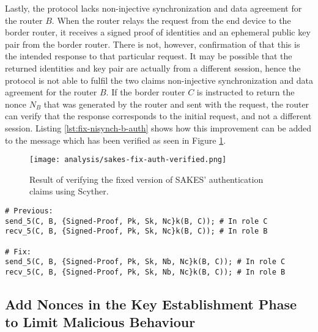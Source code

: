 Lastly, the protocol lacks non-injective synchronization and data agreement for the router $B$. When the router relays the request from the end device to the border router, it receives a signed proof of identities and an ephemeral public key pair from the border router. There is not, however, confirmation of that this is the intended response to that particular request. It may be possible that the returned identities and key pair are actually from a different session, hence the protocol is not able to fulfil the two claims non-injective synchronization and data agreement for the router $B$. If the border router $C$ is instructed to return the nonce $N_B$ that was generated by the router and sent with the request, the router can verify that the response corresponds to the initial request, and not a different session. Listing \ref{lst:fix-nisynch-b-auth} shows how this improvement can be added to the message which has been verified as seen in Figure \ref{fig:sakes-fix-auth-verified}.

\begin{figure}[H]
	\centering
	\texttt{[image: analysis/sakes-fix-auth-verified.png]}
	\caption{Result of verifying the fixed version of SAKES' authentication claims using Scyther.}
	\label{fig:sakes-fix-auth-verified}
\end{figure}


\newpage


\begin{lstlisting}[caption={[Fix to the SAKES protocol to provide non-injective synchronization and data agreement for the router during the authentication phase.]Fix to the SAKES protocol to provide non-injective synchronization and data agreement for the router $B$ during the authentication phase. Changes to the protocol are highlighted in blue.}, label={lst:fix-nisynch-b-auth}, style=code-improvements-sakes-2]
# Previous:
send_5(C, B, {Signed-Proof, Pk, Sk, Nc}k(B, C)); # In role C
recv_5(C, B, {Signed-Proof, Pk, Sk, Nc}k(B, C)); # In role B
	
# Fix:
send_5(C, B, {Signed-Proof, Pk, Sk, Nb, Nc}k(B, C)); # In role C
recv_5(C, B, {Signed-Proof, Pk, Sk, Nb, Nc}k(B, C)); # In role B
\end{lstlisting}


\subsection{Add Nonces in the Key Establishment Phase to Limit Malicious Behaviour}
\label{subsec:key-establish-nonce-fix}

